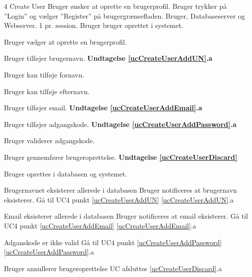 
\uchead
	{4}
	{Create User}
	{Bruger ønsker at oprette en brugerprofil.}
	{Bruger trykker på ''Login'' og vælger ''Register'' på brugergrænsefladen.}
	{Bruger, Databaseserver og Webserver.}
	{}
	{}
	{1 pr. session.}
	{Bruger bruger oprettet i systemet.}

\item \label{ucCreateUserOptions} Bruger vælger at oprette en brugerprofil. \newline

\item \label{ucCreateUserAddUN} Bruger tilføjer brugernavn.
\textbf{Undtagelse \ref{ucCreateUserAddUN}.a}

\item Bruger kan tilføje fornavn.
\item Bruger kan tilføje efternavn.

\item \label{ucCreateUserAddEmail} Bruger tilføjer email.
\textbf{Undtagelse \ref{ucCreateUserAddEmail}.a}

\item \label{ucCreateUserAddPassword} Bruger tilføjer adgangskode.
\textbf{Undtagelse \ref{ucCreateUserAddPassword}.a}

\item Bruger validerer adgangskode.

\item \label{ucCreateUserDiscard} Bruger gennemfører brugeroprettelse.
\textbf{Undtagelse \ref{ucCreateUserDiscard}}

\item \label{ucCreateUserCreated} Bruger oprettes i databasen og systemet.

\ucdescriptionend


	
	
\ucextension
	{Brugernavnet eksisterer allerede i databasen}
	{Bruger notificeres at brugernavn eksisterer.\newline
	Gå til UC4 punkt \ref{ucCreateUserAddUN}}
	{\ref{ucCreateUserAddUN}.a}
	


\ucextension
	{Email eksisterer allerede i databasen}
	{Bruger notificeres at email eksisterer.\newline
	Gå til UC4 punkt \ref{ucCreateUserAddEmail}}
	{\ref{ucCreateUserAddEmail}.a}



\ucextension
	{Adganskode er ikke valid}
	{Gå til UC4 punkt \ref{ucCreateUserAddPassword}}
	{\ref{ucCreateUserAddPassword}.a}



\ucextension
	{Bruger annullerer brugeroprettelse}
	{UC afsluttes}
	{\ref{ucCreateUserDiscard}.a}
		
